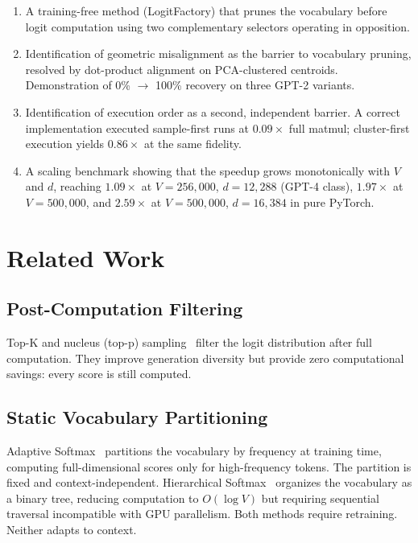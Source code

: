 \documentclass[11pt]{article}
\begin{document}
\begin{enumerate}
    \item A training-free method (LogitFactory) that prunes the vocabulary before logit computation using two complementary selectors operating in opposition.
    \item Identification of geometric misalignment as the barrier to vocabulary pruning, resolved by dot-product alignment on PCA-clustered centroids. Demonstration of 0\% $\rightarrow$ 100\% recovery on three GPT-2 variants.
    \item Identification of execution order as a second, independent barrier. A correct implementation executed sample-first runs at $0.09\times$ full matmul; cluster-first execution yields $0.86\times$ at the same fidelity.
    \item A scaling benchmark showing that the speedup grows monotonically with $V$ and $d$, reaching $1.09\times$ at $V = 256{,}000$, $d = 12{,}288$ (GPT-4 class), $1.97\times$ at $V = 500{,}000$, and $2.59\times$ at $V = 500{,}000$, $d = 16{,}384$ in pure PyTorch.
\end{enumerate}

\section{Related Work}

\subsection{Post-Computation Filtering}

Top-K and nucleus (top-p) sampling~\cite{holtzman2020curious} filter the logit distribution after full computation. They improve generation diversity but provide zero computational savings: every score is still computed.

\subsection{Static Vocabulary Partitioning}

Adaptive Softmax~\cite{grave2017efficient} partitions the vocabulary by frequency at training time, computing full-dimensional scores only for high-frequency tokens. The partition is fixed and context-independent. Hierarchical Softmax~\cite{morin2005hierarchical} organizes the vocabulary as a binary tree, reducing computation to $O(\log V)$ but requiring sequential traversal incompatible with GPU parallelism. Both methods require retraining. Neither adapts to context.
\end{document}
